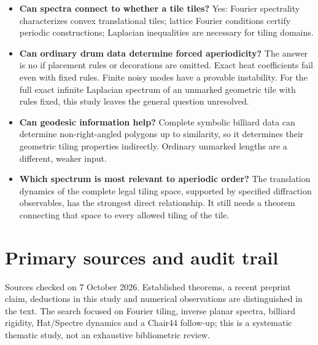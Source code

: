 \documentclass[11pt]{article}
\begin{document}
\begin{itemize}


\item \textbf{Can spectra connect to whether a tile tiles?} Yes: Fourier spectrality characterizes convex translational tiles; lattice Fourier conditions certify periodic constructions; Laplacian inequalities are necessary for tiling domains.

\item \textbf{Can ordinary drum data determine forced aperiodicity?} The answer is no if placement rules or decorations are omitted. Exact heat coefficients fail even with fixed rules. Finite noisy modes have a provable instability. For the full exact infinite Laplacian spectrum of an unmarked geometric tile with rules fixed, this study leaves the general question unresolved.

\item \textbf{Can geodesic information help?} Complete symbolic billiard data can determine non-right-angled polygons up to similarity, so it determines their geometric tiling properties indirectly. Ordinary unmarked lengths are a different, weaker input.

\item \textbf{Which spectrum is most relevant to aperiodic order?} The translation dynamics of the complete legal tiling space, supported by specified diffraction observables, has the strongest direct relationship. It still needs a theorem connecting that space to every allowed tiling of the tile.

\end{itemize}



\section*{Primary sources and audit trail}


Sources checked on 7 October 2026. Established theorems, a recent preprint claim, deductions in this study and numerical observations are distinguished in the text. The search focused on Fourier tiling, inverse planar spectra, billiard rigidity, Hat/Spectre dynamics and a Chair44 follow-up; this is a systematic thematic study, not an exhaustive bibliometric review.
\end{document}
